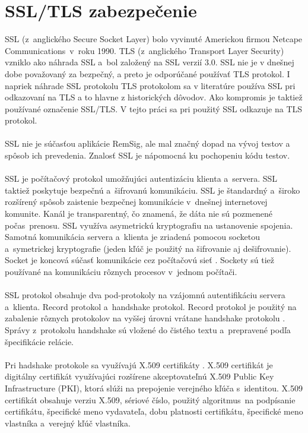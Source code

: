 \documentclass[
  printed, %
  table,   %
oneside,
  nolof,     %
  nolot,     %
]{fithesis3}
\begin{document}
\section{SSL/TLS zabezpečenie}
SSL (z~anglického Secure Socket Layer) bolo vyvinuté Americkou firmou Netcape Communications~v~roku 1990. TLS (z~anglického Transport Layer Security) vzniklo ako náhrada SSL a~bol založený na SSL verzií 3.0. SSL nie je v dnešnej dobe považovaný za bezpečný, a preto je odporúčané používať TLS protokol. I napriek náhrade SSL protokolu TLS protokolom sa v literatúre používa SSL pri odkazovaní na TLS a to hlavne z historických dôvodov. Ako kompromis je taktiež používané označenie SSL/TLS. V tejto práci sa pri použitý SSL odkazuje na TLS protokol. \paragraph{}
SSL nie je súčasťou aplikácie RemSig, ale mal značný dopad na vývoj testov a spôsob ich prevedenia. Znalosť SSL je nápomocná ku pochopeniu kódu testov.
\paragraph{}

SSL je počítačový protokol umožňujúci autentizáciu  klienta a~servera. SSL taktiež  poskytuje  bezpečnú a~šifrovanú komunikáciu.
 SSL je štandardný a~široko rozšírený spôsob zaistenie bezpečnej komunikácie v~dnešnej internetovej komunite. Kanál je transparentný, čo znamená, že dáta nie sú pozmenené počas~prenosu. SSL využíva asymetrickú kryptografiu  na ustanovenie spojenia. Samotná komunikácia servera a~klienta je zriadená pomocou socketou a~symetrickej kryptografie (jeden kľúč je použitý na šifrovanie aj dešifrovanie). Socket je koncová súčasť komunikácie cez počítačovú sieť \cite{networkSocket}. Sockety sú tiež používané na komunikáciu rôznych procesov v~jednom počítači. \paragraph{}
SSL protokol obsahuje dva pod-protokoly na vzájomnú autentifikáciu servera a~klienta. Record protokol a~handshake protokol. Record protokol je použitý na zabalenie rôznych protokolov na vyššej úrovni vrátane handshake protokolu \cite{ssl3.0}. Správy z~protokolu handshake  sú vložené do čistého textu a~prepravené podľa špecifikácie relácie. \paragraph{}
Pri hadshake protokole sa využívajú X.509 certifikáty \cite{x509cert}. X.509 certifikát je digitálny certifikát využívajúci rozšírene akceptovateľnú X.509 Public Key Infrastructure (PKI), ktorá slúži na prepojenie verejného kľúča s~identitou.  X.509 certifikát obsahuje verziu X.509, sériové číslo, použitý algoritmus~na podpísanie certifikátu, špecifické meno vydavateľa, dobu platnosti certifikátu, špecifické meno vlastníka a~verejný kľúč vlastníka.  
\end{document}
